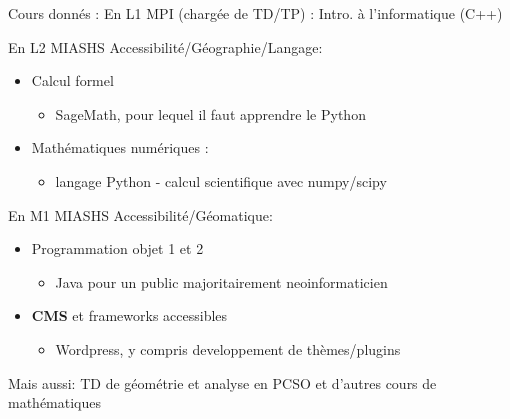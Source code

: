 \documentclass[professionalfont, 12pt, dvipdfmx, default, cjk]{beamer}
\providecommand{\tightlist}{%
    \setlength{\itemsep}{0pt}\setlength{\parskip}{0pt}}
\begin{document}
\begin{frame}{Cours donnés :}
\protect\hypertarget{cours-donnuxe9s}{}
En L1 MPI (chargée de TD/TP) : Intro. à l'informatique (C++)

En L2 MIASHS Accessibilité/Géographie/Langage:

\begin{itemize}
\tightlist
\item
  Calcul formel

  \begin{itemize}
  \tightlist
  \item
    SageMath, pour lequel il faut apprendre le Python
  \end{itemize}
\item
  Mathématiques numériques :

  \begin{itemize}
  \tightlist
  \item
    langage Python - calcul scientifique avec numpy/scipy
  \end{itemize}
\end{itemize}

En M1 MIASHS Accessibilité/Géomatique:

\begin{itemize}
\tightlist
\item
  Programmation objet 1 et 2

  \begin{itemize}
  \tightlist
  \item
    Java pour un public majoritairement neoinformaticien
  \end{itemize}
\item
  \textbf{CMS} et frameworks accessibles

  \begin{itemize}
  \tightlist
  \item
    Wordpress, y compris developpement de thèmes/plugins
  \end{itemize}
\end{itemize}

Mais aussi: TD de géométrie et analyse en PCSO et d'autres cours de
mathématiques
\end{frame}
\end{document}
